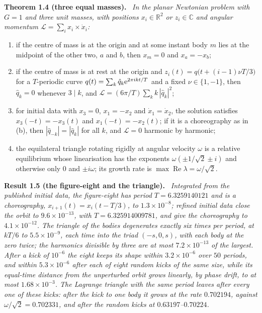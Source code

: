\documentclass[11pt]{article}
\theoremstyle{definition}\newtheorem{definition}[theorem]{Definition}
\theoremstyle{remark}\newtheorem{remark}[theorem]{Remark}
\newenvironment{mainresult}[1]{\par\medskip\noindent\textbf{#1}\ \itshape\ignorespaces}{\par\medskip}
\newcommand{\R}{\mathbb R}\newcommand{\C}{\mathbb C}\newcommand{\N}{\mathbb N}
\renewcommand{\Re}{\operatorname{Re}}\renewcommand{\Im}{\operatorname{Im}}
\begin{document}
\begin{mainresult}{Theorem 1.4 (three equal masses).}
In the planar Newtonian problem with $G=1$ and three unit masses, with positions $x_i\in\R^2$ or $z_i\in\C$ and angular momentum $\mathcal L=\sum_ix_i\times\dot x_i$:
\begin{enumerate}[label=(\alph*)]
\item if the centre of mass is at the origin and at some instant body $m$ lies at the midpoint of the other two, $a$ and $b$, then $x_m=0$ and $x_a=-x_b$;
\item if the centre of mass is at rest at the origin and $z_i(t)=q\bigl(t+(i-1)\nu T/3\bigr)$ for a $T$-periodic curve $q(t)=\sum_k\hat q_k\mathrm e^{2\pi ikt/T}$ and a fixed $\nu\in\{1,-1\}$, then $\hat q_k=0$ whenever $3\mid k$, and $\mathcal L=(6\pi/T)\sum_k k\,|\hat q_k|^2$;
\item for initial data with $x_3=0$, $x_1=-x_2$ and $\dot x_1=\dot x_2$, the solution satisfies $x_3(-t)=-x_3(t)$ and $x_1(-t)=-x_2(t)$; if it is a choreography as in (b), then $|\hat q_{-k}|=|\hat q_k|$ for all $k$, and $\mathcal L=0$ harmonic by harmonic;
\item the equilateral triangle rotating rigidly at angular velocity $\omega$ is a relative equilibrium whose linearisation has the exponents $\omega(\pm1/\sqrt2\pm i)$ and otherwise only $0$ and $\pm i\omega$; its growth rate is $\max\Re\lambda=\omega/\sqrt2$.
\end{enumerate}
\end{mainresult}

\begin{mainresult}{Result 1.5 (the figure-eight and the triangle).}
Integrated from the published initial data, the figure-eight has period $T=6.3259140121$ and is a choreography, $x_{i+1}(t)=x_i(t-T/3)$, to $1.3\times10^{-8}$; refined initial data close the orbit to $9.6\times10^{-13}$, with $T=6.325914009781$, and give the choreography to $4.1\times10^{-12}$. The triangle of the bodies degenerates exactly six times per period, at $kT/6$ to $5.5\times10^{-9}$, each time into the triad $(-s,0,s)$, with each body at the zero twice; the harmonics divisible by three are at most $7.2\times10^{-13}$ of the largest. After a kick of $10^{-6}$ the eight keeps its shape within $3.2\times10^{-6}$ over $50$ periods, and within $5.3\times10^{-6}$ after each of eight random kicks of the same size, while its equal-time distance from the unperturbed orbit grows linearly, by phase drift, to at most $1.68\times10^{-3}$. The Lagrange triangle with the same period leaves after every one of these kicks: after the kick to one body it grows at the rate $0.702194$, against $\omega/\sqrt2=0.702331$, and after the random kicks at $0.63197$--$0.70224$.
\end{mainresult}
\end{document}
